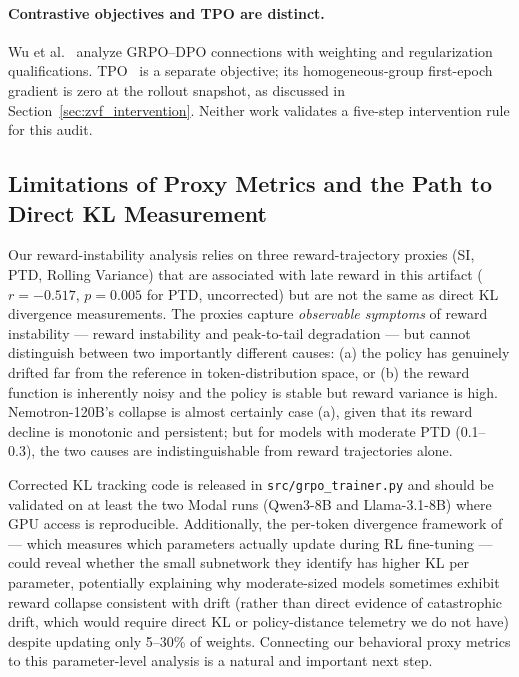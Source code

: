 \paragraph{Contrastive objectives and TPO are distinct.}
Wu et al.~\citep{wu2025grpodpo} analyze GRPO--DPO connections with weighting
and regularization qualifications. TPO~\citep{kaddour2026tpo} is a separate
objective; its homogeneous-group first-epoch gradient is zero at the rollout
snapshot, as discussed in Section~\ref{sec:zvf_intervention}. Neither work
validates a five-step intervention rule for this audit.

\subsection{Limitations of Proxy Metrics and the Path to Direct KL Measurement}
\label{sec:discuss_kl}

Our reward-instability analysis relies on three reward-trajectory proxies (SI, PTD,
Rolling Variance) that are associated with late reward in this artifact
($r = -0.517$, $p = 0.005$ for PTD, uncorrected) but are not the same as direct
KL divergence measurements.
The proxies capture \emph{observable symptoms} of reward instability --- reward
instability and peak-to-tail degradation --- but cannot distinguish between
two importantly different causes: (a) the policy has genuinely drifted far from
the reference in token-distribution space, or (b) the reward function is
inherently noisy and the policy is stable but reward variance is high.
Nemotron-120B's collapse is almost certainly case (a), given that its reward
decline is monotonic and persistent; but for models with moderate PTD (0.1--0.3),
the two causes are indistinguishable from reward trajectories alone.

Corrected KL tracking code is released in \texttt{src/grpo\_trainer.py} and
should be validated on at least the two Modal runs (Qwen3-8B and
Llama-3.1-8B) where GPU access is reproducible.
Additionally, the per-token divergence framework of \citet{liu2025rlsubnetworks}
--- which measures which parameters actually update during RL fine-tuning ---
could reveal whether the small subnetwork they identify has higher KL per
parameter, potentially explaining why moderate-sized models sometimes exhibit reward collapse consistent with drift (rather than direct evidence of catastrophic drift, which would require direct KL or policy-distance telemetry we do not have) despite updating only 5--30\% of weights.
Connecting our behavioral proxy metrics to this parameter-level analysis is a
natural and important next step.
